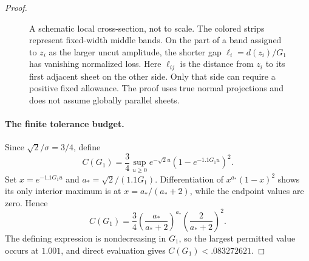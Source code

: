 \begin{proof}
\begin{figure}[ht]
\centering
{}
\caption{A schematic local cross-section, not to scale. The colored strips represent fixed-width middle bands. On the part of a band assigned to $z_i$ as the larger uncut amplitude, the shorter gap $\ell_i=d(z_i)/G_1$ has vanishing normalized loss. Here $\ell_{ij}$ is the distance from $z_i$ to its first adjacent sheet on the other side. Only that side can require a positive fixed allowance. The proof uses true normal projections and does not assume globally parallel sheets.}
\label{fig:radial-interpolation}
\end{figure}

\paragraph{The finite tolerance budget.}

Since $\sqrt2/\sigma=3/4$, define
\begin{equation}\label{eq:radial-loss-number}
 C(G_1)=\frac34\sup_{u\ge0}
       e^{-\sqrt2u}(1-e^{-1.1G_1u})^2.
\end{equation}
Set $x=e^{-1.1G_1u}$ and $a_*=\sqrt2/(1.1G_1)$. Differentiation of
$x^{a_*}(1-x)^2$ shows its only interior maximum is at
$x=a_* /(a_*+2)$, while the endpoint values are zero. Hence
\begin{equation}\label{eq:radial-maximum}
 C(G_1)=\frac34
 \left(\frac{a_*}{a_*+2}\right)^{a_*}
 \left(\frac2{a_*+2}\right)^2.
\end{equation}
The defining expression is nondecreasing in $G_1$, so the largest permitted value occurs at $1.001$, and direct evaluation gives
$C(G_1)<.083272621$.


\end{proof}
